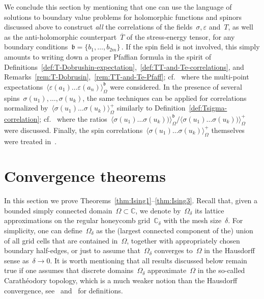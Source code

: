 \documentclass[reqno,11pt,a4paper]{amsart}
\theoremstyle{remark}
\newcommand{\C}{\mathbb{C}}
\renewcommand{\b}{\mathfrak{b}}
\newcommand\Corr[1]{\langle #1 \rangle}
\newcommand\CorrO[2][+]{\Corr{#2}_\Omega^{#1}}
\begin{document}
We conclude this section by mentioning that one can use the language of solutions to boundary value problems for holomorphic functions and spinors discussed above to construct \emph{all} the correlations of the fields~$\sigma,\varepsilon$ and~$T$, as well as the anti-holomorphic counterpart~$\overline{T}$ of the stress-energy tensor, for any boundary conditions~$\b=\{b_1,\dots,b_{2m}\}$\,. If the spin field is not involved, this simply amounts to writing down a proper Pfaffian formula in the spirit of Definitions~\ref{def:T-Dobrushin-expectation},~\ref{def:TT-and-Te-correlations}, and Remarks~\ref{rem:T-Dobrusin},~\ref{rem:TT-and-Te-Pfaff}; cf.~\cite{Hon10} where the multi-point expectations~$\CorrO[\b]{\varepsilon(a_1)\dots\varepsilon(a_n)}$ were considered. In the presence of several spins~$\sigma(u_1),\dots,\sigma(u_k)$, the same techniques can be applied for correlations normalized by~$\CorrO{\sigma(u_1)\dots\sigma(u_k)}$ similarly to Definition~\ref{def:Tsigma-correlation}; cf.~\cite[Section~5]{IkhCar09} where the ratios~$\CorrO[\b]{\sigma(u_1)\dots\sigma(u_k))}/\CorrO{\sigma(u_1)\dots\sigma(u_k))}$ were discussed. Finally, the spin correlations~$\CorrO{\sigma(u_1)\dots\sigma(u_k)}$ themselves were treated in~\cite{CheHonIzy15}.

\setcounter{equation}{0}
\section{Convergence theorems}
\label{sec:Ising-convergence}

In this section we prove Theorems~\mbox{\ref{thm:Ising1}--\ref{thm:Ising3}}. Recall that, given a bounded simply connected domain~$\Omega\subset\C$, we denote by~$\Omega_\delta$ its lattice approximations on the regular honeycomb grid~$\C_\delta$ with the mesh size~$\delta$. For simplicity, one can define~$\Omega_\delta$ as the (largest connected component of the) union of all grid cells that are contained in~$\Omega$, together with appropriately chosen boundary half-edges, or just to assume that~$\Omega_\delta$ converges to~$\Omega$ in the Hausdorff sense as~$\delta\to 0$. It is worth mentioning that all results discussed below remain true if one assumes that discrete domains~$\Omega_\delta$ approximate~$\Omega$ in the so-called Carath\'eodory topology, which is a much weaker notion than the Hausdorff convergence, see~\cite[Chapter~1.4]{Pom92} and~\cite[Section~3.2]{CheSmi11} for definitions.
\end{document}

